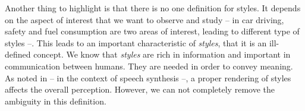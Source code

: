   \par Another thing to highlight is that there is no one definition for styles. It depends on the aspect of interest that we want to observe and study -- in car driving, safety and fuel consumption are two areas of interest, leading to different type of styles --. This leads to an important characteristic of \textit{styles}, that it is an ill-defined concept. We know that \textit{styles} are rich in information and important in communication between humans. They are needed in order to convey meaning. As noted in \citep{taylor2009text} -- in the context of speech synthesis --, a proper rendering of styles affects the overall perception. However, we can not completely remove the ambiguity in this definition.







